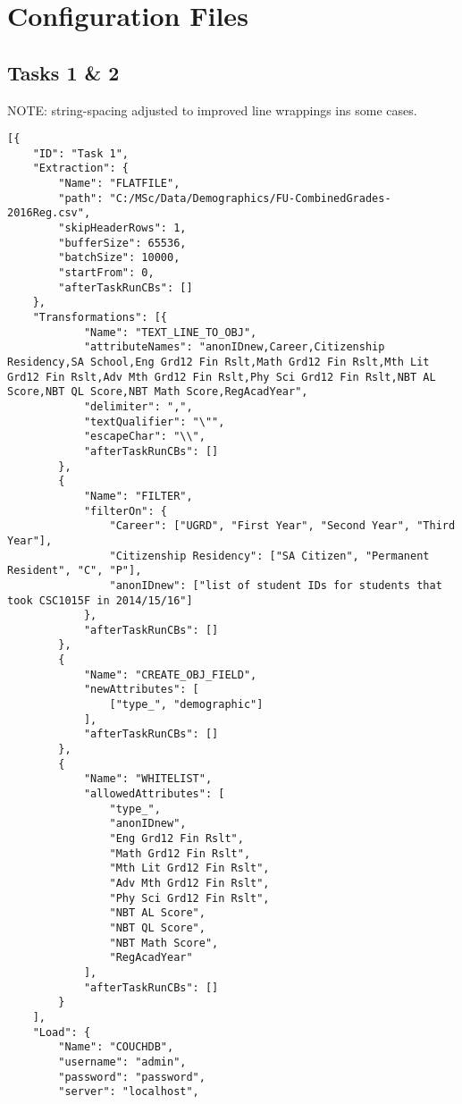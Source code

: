 \section{Configuration Files}
\label{netl-configuration}

\subsection{Tasks 1 \& 2}
\label{netl-tasks-1-2-config}
NOTE: string-spacing adjusted to improved line wrappings ins some cases.
\begin{verbatim}
[{
    "ID": "Task 1",
    "Extraction": {
        "Name": "FLATFILE",
        "path": "C:/MSc/Data/Demographics/FU-CombinedGrades-2016Reg.csv",
        "skipHeaderRows": 1,
        "bufferSize": 65536,
        "batchSize": 10000,
        "startFrom": 0,
        "afterTaskRunCBs": []
    },
    "Transformations": [{
            "Name": "TEXT_LINE_TO_OBJ",
            "attributeNames": "anonIDnew,Career,Citizenship Residency,SA School,Eng Grd12 Fin Rslt,Math Grd12 Fin Rslt,Mth Lit Grd12 Fin Rslt,Adv Mth Grd12 Fin Rslt,Phy Sci Grd12 Fin Rslt,NBT AL Score,NBT QL Score,NBT Math Score,RegAcadYear",
            "delimiter": ",",
            "textQualifier": "\"",
            "escapeChar": "\\",
            "afterTaskRunCBs": []
        },
        {
            "Name": "FILTER",
            "filterOn": {
                "Career": ["UGRD", "First Year", "Second Year", "Third Year"],
                "Citizenship Residency": ["SA Citizen", "Permanent Resident", "C", "P"],
                "anonIDnew": ["list of student IDs for students that took CSC1015F in 2014/15/16"]
            },
            "afterTaskRunCBs": []
        },
        {
            "Name": "CREATE_OBJ_FIELD",
            "newAttributes": [
                ["type_", "demographic"]
            ],
            "afterTaskRunCBs": []
        },
        {
            "Name": "WHITELIST",
            "allowedAttributes": [
                "type_",
                "anonIDnew",
                "Eng Grd12 Fin Rslt",
                "Math Grd12 Fin Rslt",
                "Mth Lit Grd12 Fin Rslt",
                "Adv Mth Grd12 Fin Rslt",
                "Phy Sci Grd12 Fin Rslt",
                "NBT AL Score",
                "NBT QL Score",
                "NBT Math Score",
                "RegAcadYear"
            ],
            "afterTaskRunCBs": []
        }
    ],
    "Load": {
        "Name": "COUCHDB",
        "username": "admin",
        "password": "password",
        "server": "localhost",

\end{verbatim}
